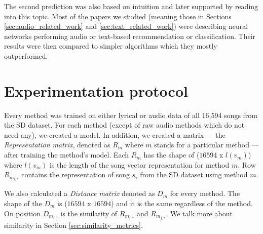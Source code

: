 The second prediction was also based on intuition and later supported by reading into this topic. Most of the papers we studied (meaning those in Sections \ref{sec:audio_related_work} and \ref{sec:text_related_work}) were describing neural networks performing audio or text-based recommendation or classification. Their results were then compared to simpler algorithms which they mostly outperformed. 

\section{Experimentation protocol}
Every method was trained on either lyrical or audio data of all 16,594 songs from the SD dataset.
For each method (except of raw audio methods which do not need any), we created a model. In addition, we created a matrix --- the \textit{Representation matrix}, denoted as  $R_m$ where $m$ stands for a particular method ---  after training the method's model. Each $R_m$ has the shape of ($16594$ x $l(v_m) $) where $l(v_m)$ is the length of the song vector representation for method $m$. Row $R_{m_{i,*}}$ contains the representation of song $s_i$ from the SD dataset using method $m$. 

We also calculated a \textit{Distance matrix} denoted as $D_m$ for every method. The shape of the $D_m$ is ($16594 $ x $ 16594$) and it is the same regardless of the method. On position $D_{m_{i,j}}$ is the similarity of $R_{m_{i,*}}$ and $R_{m_{j,*}}$. We talk more about similarity in Section \ref{sec:similarity_metrics}. \\


